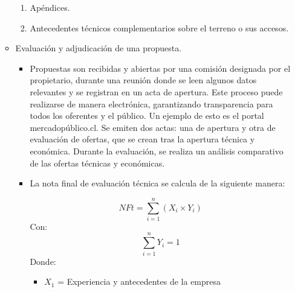 \documentclass{article} %
\begin{document}
\begin{itemize}[label={},left=0pt,align=parleft]
\begin{itemize}[label={},left=1em,align=parleft]
\begin{enumerate}
            \item \begin{highlightbox}[levelfour] Apéndices. \end{highlightbox}
            \item \begin{highlightbox}[levelfour] Antecedentes técnicos complementarios sobre el terreno o sus accesos. \end{highlightbox}
        \end{enumerate}
        \item \begin{highlightbox}[leveltwo] Evaluación y adjudicación de una propuesta. \end{highlightbox}
        \begin{itemize}[label={},left=2em,align=parleft]
            \item \begin{highlightbox}[levelthree] Propuestas son recibidas y abiertas por una comisión designada por el propietario, durante una reunión donde se leen algunos datos relevantes y se registran en un acta de apertura. Este proceso puede realizarse de manera electrónica, garantizando transparencia para todos los oferentes y el público. Un ejemplo de esto es el portal mercadopúblico.cl. Se emiten dos actas: una de apertura y otra de evaluación de ofertas, que se crean tras la apertura técnica y económica. Durante la evaluación, se realiza un análisis comparativo de las ofertas técnicas y económicas. \end{highlightbox}
            \item \begin{highlightbox}[levelthree] La nota final de evaluación técnica se calcula de la siguiente manera: \end{highlightbox}
            \begin{equation}
                NFt = \sum_{i=1}^{n} (X_i \times Y_i)
            \end{equation}
            Con:
            \begin{equation}
                \sum_{i=1}^{n} Y_i = 1 
            \end{equation}
            Donde:
            \begin{itemize}[label={},left=3em,align=parleft]
                \item \begin{highlightbox}[levelfour] $X_1$ = Experiencia y antecedentes de la empresa \end{highlightbox}

\end{itemize}
\end{itemize}
\end{itemize}
\end{itemize}
\end{document}
